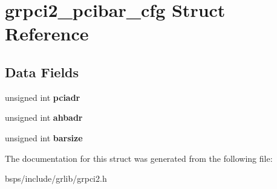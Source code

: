 \hypertarget{structgrpci2__pcibar__cfg}{}\section{grpci2\+\_\+pcibar\+\_\+cfg Struct Reference}
\label{structgrpci2__pcibar__cfg}
\subsection*{Data Fields}
\begin{DoxyCompactItemize}
\item 
\mbox{\label{structgrpci2__pcibar__cfg_a66b2d18015f41d86fb674f4380c2c927}} 
unsigned int {\bfseries pciadr}
\item 
\mbox{\label{structgrpci2__pcibar__cfg_a7c8d0fa55de8b5b52f427608838d3b4e}} 
unsigned int {\bfseries ahbadr}
\item 
\mbox{\label{structgrpci2__pcibar__cfg_a30d64e9f53ba6dcde2c37ce9dbb3d5a0}} 
unsigned int {\bfseries barsize}
\end{DoxyCompactItemize}


The documentation for this struct was generated from the following file\+:\begin{DoxyCompactItemize}
\item 
bsps/include/grlib/grpci2.\+h\end{DoxyCompactItemize}
